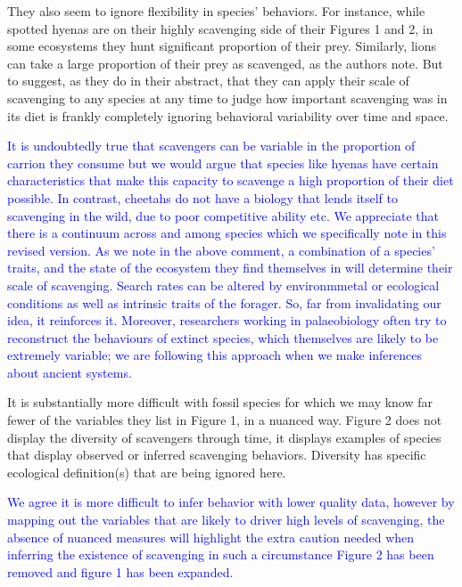 \documentclass[12pt,letterpaper]{article}
\begin{document}
They also seem to ignore flexibility in species' behaviors.
For instance, while spotted hyenas are on their highly scavenging side of their Figures 1 and 2, in some ecosystems they hunt significant proportion of their prey.
Similarly, lions can take a large proportion of their prey as scavenged, as the authors note.
But to suggest, as they do in their abstract, that they can apply their scale of scavenging to any species at any time to judge how important scavenging was in its diet is frankly completely ignoring behavioral variability over time and space. 
\bigskip

\textcolor{blue}{It is undoubtedly true that scavengers can be variable in the proportion of carrion they consume but we would argue that species like hyenas have certain characteristics that make this capacity to scavenge  a high proportion of their diet possible.
In contrast, cheetahs do not have a biology that lends itself to scavenging in the wild, due to poor competitive ability etc.
We appreciate that there is a continuum across and among species which we specifically note in this revised version. 
As we note in the above comment, a combination of a species' traits, and the state of the ecosystem they find themselves in will determine their scale of scavenging. 
Search rates can be altered by environmmetal or ecological conditions as well as intrinsic traits of the forager. 
So, far from invalidating our idea, it reinforces it.
Moreover, researchers working in palaeobiology often try to reconstruct the behaviours of extinct species, which themselves are likely to be extremely variable; we are following this approach when we make inferences about ancient systems.}
\bigskip

It is substantially more difficult with fossil species for which we may know far fewer of the variables they list in Figure 1, in a nuanced way.
Figure 2 does not display the diversity of scavengers through time, it displays examples of species that display observed or inferred scavenging behaviors.
Diversity has specific ecological definition(s) that are being ignored here.
\bigskip

\textcolor{blue}{We agree it is more difficult to infer behavior with lower quality data, however by mapping out the variables that are likely to driver high levels of scavenging, the absence of nuanced measures will highlight the extra caution needed when inferring the existence of scavenging in such a circumstance}
\textcolor{blue}{Figure 2 has been removed and figure 1 has been expanded.}
\end{document}
